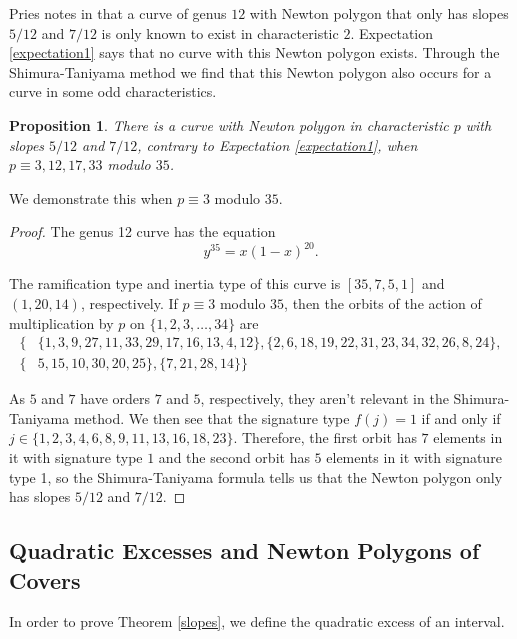 \documentclass{article}
\newtheorem{proposition}[theorem]{Proposition}
\theoremstyle{remark}
\theoremstyle{definition}
\begin{document}
\par \hspace{\parindent} Pries notes in \cite[Section 5.3]{pries_newtonpolygons} that a curve of genus $12$ with Newton polygon that only has slopes $5/12$ and $7/12$ is only known to exist in characteristic $2$. Expectation \ref{expectation1} says that no curve with this Newton polygon exists. Through the Shimura-Taniyama method we find that this Newton polygon also occurs for a curve in some odd characteristics.


\begin{proposition}
    There is a curve with Newton polygon in characteristic $p$ with slopes $5/12$ and $7/12$, contrary to Expectation \ref{expectation1}, when $p \equiv 3,12,17,33$ modulo $35$. 
\end{proposition}

\par We demonstrate this when $p \equiv 3$ modulo $35$.

\begin{proof}
    The genus 12 curve has the equation 
    \[y^{35} = x(1-x)^{20}.\]
    
    The ramification type and inertia type of this curve is $[35,7,5,1]$ and $(1,20,14)$, respectively. If $p \equiv 3$ modulo $35$, then the orbits of the action of multiplication by $p$ on $\{1,2,3,\ldots,34\}$ are
    \begin{align*}\{&\{1,3,9,27,11,33,29,17,16,13,4,12\}, \{2,6,18,19,22,31,23,34,32,26,8,24\} , \\ \{&5,15,10,30,20,25\}, \{7,21,28,14\}\}
    \end{align*}
    
    As $5$ and $7$ have orders $7$ and $5$, respectively, they aren't relevant in the Shimura-Taniyama method. We then see that the signature type $f(j)=1$ if and only if $j \in \{1,2,3,4,6,8,9,11,13,16,18,23\}$. Therefore, the first orbit has $7$ elements in it with signature type $1$ and the second orbit has $5$ elements in it with signature type 1, so the Shimura-Taniyama formula tells us that the Newton polygon only has slopes $5/12$ and $7/12$.
\end{proof}

\subsection{Quadratic Excesses and Newton Polygons of Covers} \label{qe}
\par \hspace{\parindent} In order to prove Theorem \ref{slopes}, we define the quadratic excess of an interval.
\end{document}
